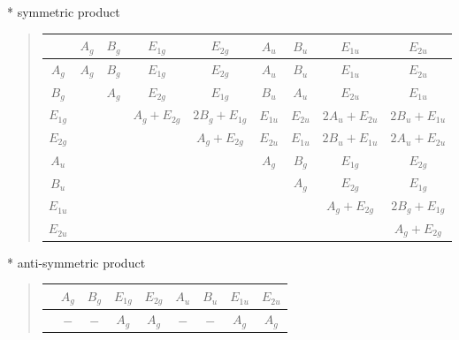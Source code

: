 \documentclass[fleqn,8pt,landscape]{jsarticle}
\begin{document}
* symmetric product
\begin{quote}
\begin{tabular}{c|cccccccc} \hline \hline
 & $ A_{g} $ & $ B_{g} $ & $ E_{1g} $ & $ E_{2g} $ & $ A_{u} $ & $ B_{u} $ & $ E_{1u} $ & $ E_{2u} $ \\ \hline
$ A_{g} $ & $ A_{g} $ & $ B_{g} $ & $ E_{1g} $ & $ E_{2g} $ & $ A_{u} $ & $ B_{u} $ & $ E_{1u} $ & $ E_{2u} $ \\
$ B_{g} $ & $  $ & $ A_{g} $ & $ E_{2g} $ & $ E_{1g} $ & $ B_{u} $ & $ A_{u} $ & $ E_{2u} $ & $ E_{1u} $ \\
$ E_{1g} $ & $  $ & $  $ & $ A_{g} + E_{2g} $ & $ 2 B_{g} + E_{1g} $ & $ E_{1u} $ & $ E_{2u} $ & $ 2 A_{u} + E_{2u} $ & $ 2 B_{u} + E_{1u} $ \\
$ E_{2g} $ & $  $ & $  $ & $  $ & $ A_{g} + E_{2g} $ & $ E_{2u} $ & $ E_{1u} $ & $ 2 B_{u} + E_{1u} $ & $ 2 A_{u} + E_{2u} $ \\
$ A_{u} $ & $  $ & $  $ & $  $ & $  $ & $ A_{g} $ & $ B_{g} $ & $ E_{1g} $ & $ E_{2g} $ \\
$ B_{u} $ & $  $ & $  $ & $  $ & $  $ & $  $ & $ A_{g} $ & $ E_{2g} $ & $ E_{1g} $ \\
$ E_{1u} $ & $  $ & $  $ & $  $ & $  $ & $  $ & $  $ & $ A_{g} + E_{2g} $ & $ 2 B_{g} + E_{1g} $ \\
$ E_{2u} $ & $  $ & $  $ & $  $ & $  $ & $  $ & $  $ & $  $ & $ A_{g} + E_{2g} $ \\
 \hline \hline
\end{tabular}
\end{quote}

* anti-symmetric product
\begin{quote}
\begin{tabular}{ccccccccc} \hline \hline
 & $ A_{g} $ & $ B_{g} $ & $ E_{1g} $ & $ E_{2g} $ & $ A_{u} $ & $ B_{u} $ & $ E_{1u} $ & $ E_{2u} $ \\ \hline
$  $ & $ - $ & $ - $ & $ A_{g} $ & $ A_{g} $ & $ - $ & $ - $ & $ A_{g} $ & $ A_{g} $ \\
 \hline \hline
\end{tabular}
\end{quote}
\end{document}
